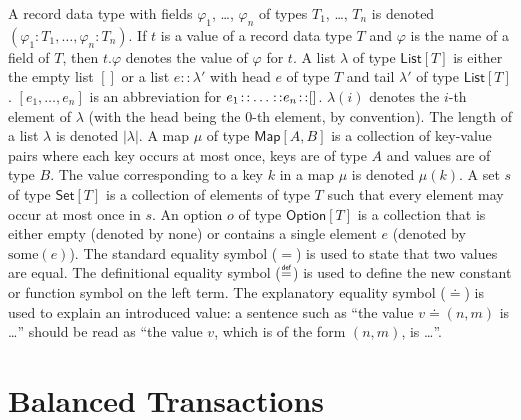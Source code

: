 \documentclass{llncs}
\newcommand{\defeq}{\mathrel{\overset{\makebox[0pt]{\mbox{\normalfont\tiny\sffamily def}}}{=}}}
\newcommand{\expeq}{\doteq}
\newcommand{\cons}{\colon\hspace{-3pt}\colon\hspace{-3pt}}
\newcommand{\append}{\colon\hspace{-3pt}\colon\hspace{-3pt}\colon\hspace{-3pt}}
\newcommand{\hash}[1]{#1^{\scriptscriptstyle\#}}
\newcommand{\nil}{[]}
\newcommand{\type}[1]{\mathsf{#1}}
\newcommand{\listT}{\type{List}}
\newcommand{\setT}{\type{Set}}
\newcommand{\mapT}{\type{Map}}
\newcommand{\maybeT}{\type{Option}}
\newcommand{\func}[1]{\mathrm{#1}}
\newcommand{\nothing}{\func{none}}
\newcommand{\just}{\func{some}}
\begin{document}
A record data type with fields $\varphi_1$, \ldots, $\varphi_n$ of types $T_1$, \ldots, $T_n$ is denoted $(\varphi_1\colon T_1,\ldots,\varphi_n\colon T_n)$. 
If $t$ is a value of a record data type $T$ and $\varphi$ is the name of a field of $T$, then $t.\varphi$ denotes the value of $\varphi$ for $t$. 
A list $\lambda$ of type $\listT[T]$ is either the empty list $\nil$ or 
a list $e::\lambda'$ with head $e$ of type $T$ and tail $\lambda'$ of type $\listT[T]$. $[e_1, \ldots, e_n]$ is an abbreviation for $e_1\cons\ldots\cons e_n\cons\nil$. $\lambda(i)$ denotes the $i$-th element of $\lambda$ (with the head being the 0-th element, by convention).
The length of a list $\lambda$ is denoted $|\lambda|$. 
A map $\mu$ of type $\mapT[A, B]$ is a collection of key-value pairs where each key occurs at most once, keys are of type $A$ and values are of type $B$. The value corresponding to a key $k$ in a map $\mu$ is denoted $\mu(k)$. A set $s$ of type $\setT[T]$ is a collection of elements of type $T$ such that every element may occur at most once in $s$. An option $o$ of type $\maybeT[T]$ is a collection that is either empty (denoted by $\nothing$) or contains a single element $e$ (denoted by $\just(e)$).
The standard equality symbol ($=$) is used to state that two values are equal. The definitional equality symbol ($\defeq$) is used to define the new constant or function symbol on the left term. The explanatory equality symbol ($\expeq$) is used to explain an introduced value: a sentence such as ``the value $v \expeq (n, m)$ is \ldots'' should be read as ``the value $v$, which is of the form $(n,m)$, is \ldots''. 

\section{Balanced Transactions}
\end{document}
